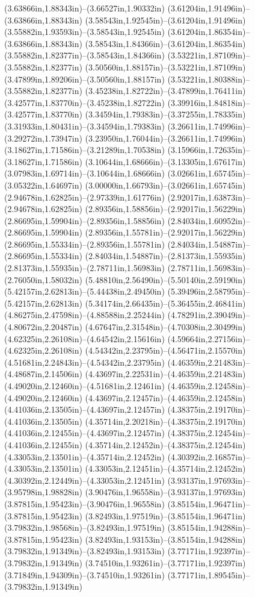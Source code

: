 (3.63866in,1.88343in)--(3.66527in,1.90332in) (3.61204in,1.91496in)--(3.63866in,1.88343in) (3.58543in,1.92545in)--(3.61204in,1.91496in) (3.55882in,1.93593in)--(3.58543in,1.92545in) (3.61204in,1.86354in)--(3.63866in,1.88343in) (3.58543in,1.84366in)--(3.61204in,1.86354in) (3.55882in,1.82377in)--(3.58543in,1.84366in) (3.53221in,1.87109in)--(3.55882in,1.82377in) (3.50560in,1.88157in)--(3.53221in,1.87109in) (3.47899in,1.89206in)--(3.50560in,1.88157in) (3.53221in,1.80388in)--(3.55882in,1.82377in) (3.45238in,1.82722in)--(3.47899in,1.76411in) (3.42577in,1.83770in)--(3.45238in,1.82722in) (3.39916in,1.84818in)--(3.42577in,1.83770in) (3.34594in,1.79383in)--(3.37255in,1.78335in) (3.31933in,1.80431in)--(3.34594in,1.79383in) (3.26611in,1.74996in)--(3.29272in,1.73947in) (3.23950in,1.76044in)--(3.26611in,1.74996in) (3.18627in,1.71586in)--(3.21289in,1.70538in) (3.15966in,1.72635in)--(3.18627in,1.71586in) (3.10644in,1.68666in)--(3.13305in,1.67617in) (3.07983in,1.69714in)--(3.10644in,1.68666in) (3.02661in,1.65745in)--(3.05322in,1.64697in) (3.00000in,1.66793in)--(3.02661in,1.65745in) (2.94678in,1.62825in)--(2.97339in,1.61776in) (2.92017in,1.63873in)--(2.94678in,1.62825in) (2.89356in,1.58856in)--(2.92017in,1.56229in) (2.86695in,1.59904in)--(2.89356in,1.58856in) (2.84034in,1.60952in)--(2.86695in,1.59904in) (2.89356in,1.55781in)--(2.92017in,1.56229in) (2.86695in,1.55334in)--(2.89356in,1.55781in) (2.84034in,1.54887in)--(2.86695in,1.55334in) (2.84034in,1.54887in)--(2.81373in,1.55935in) (2.81373in,1.55935in)--(2.78711in,1.56983in) (2.78711in,1.56983in)--(2.76050in,1.58032in) (5.48810in,2.56490in)--(5.50140in,2.59190in) (5.42157in,2.62813in)--(5.44438in,2.49450in) (5.39496in,2.58795in)--(5.42157in,2.62813in) (5.34174in,2.66435in)--(5.36455in,2.46841in) (4.86275in,2.47598in)--(4.88588in,2.25244in) (4.78291in,2.39049in)--(4.80672in,2.20487in) (4.67647in,2.31548in)--(4.70308in,2.30499in) (4.62325in,2.26108in)--(4.64542in,2.15616in) (4.59664in,2.27156in)--(4.62325in,2.26108in) (4.54342in,2.23795in)--(4.56471in,2.15570in) (4.51681in,2.24843in)--(4.54342in,2.23795in) (4.46359in,2.21483in)--(4.48687in,2.14506in) (4.43697in,2.22531in)--(4.46359in,2.21483in) (4.49020in,2.12460in)--(4.51681in,2.12461in) (4.46359in,2.12458in)--(4.49020in,2.12460in) (4.43697in,2.12457in)--(4.46359in,2.12458in) (4.41036in,2.13505in)--(4.43697in,2.12457in) (4.38375in,2.19170in)--(4.41036in,2.13505in) (4.35714in,2.20218in)--(4.38375in,2.19170in) (4.41036in,2.12455in)--(4.43697in,2.12457in) (4.38375in,2.12454in)--(4.41036in,2.12455in) (4.35714in,2.12452in)--(4.38375in,2.12454in) (4.33053in,2.13501in)--(4.35714in,2.12452in) (4.30392in,2.16857in)--(4.33053in,2.13501in) (4.33053in,2.12451in)--(4.35714in,2.12452in) (4.30392in,2.12449in)--(4.33053in,2.12451in) (3.93137in,1.97693in)--(3.95798in,1.98828in) (3.90476in,1.96558in)--(3.93137in,1.97693in) (3.87815in,1.95423in)--(3.90476in,1.96558in) (3.85154in,1.96471in)--(3.87815in,1.95423in) (3.82493in,1.97519in)--(3.85154in,1.96471in) (3.79832in,1.98568in)--(3.82493in,1.97519in) (3.85154in,1.94288in)--(3.87815in,1.95423in) (3.82493in,1.93153in)--(3.85154in,1.94288in) (3.79832in,1.91349in)--(3.82493in,1.93153in) (3.77171in,1.92397in)--(3.79832in,1.91349in) (3.74510in,1.93261in)--(3.77171in,1.92397in) (3.71849in,1.94309in)--(3.74510in,1.93261in) (3.77171in,1.89545in)--(3.79832in,1.91349in) 